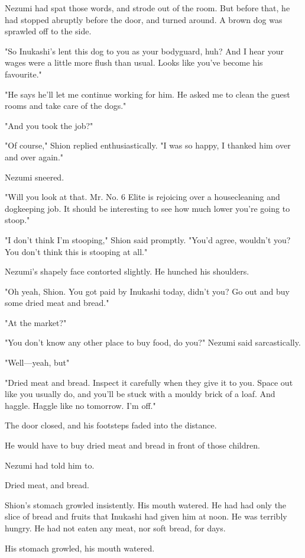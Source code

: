 Nezumi had spat those words, and strode out of the room. But before
that, he had stopped abruptly before the door, and turned around. A
brown dog was sprawled off to the side.

"So Inukashi's lent this dog to you as your bodyguard, huh? And I hear
your wages were a little more flush than usual. Looks like you've become
his favourite."

"He says he'll let me continue working for him. He asked me to clean the
guest rooms and take care of the dogs."

"And you took the job?"

"Of course," Shion replied enthusiastically. "I was so happy, I thanked
him over and over again."

Nezumi sneered.

"Will you look at that. Mr. No. 6 Elite is rejoicing over a
housecleaning and dogkeeping job. It should be interesting to see how
much lower you're going to stoop."

"I don't think I'm stooping," Shion said promptly. "You'd agree,
wouldn't you? You don't think this is stooping at all."

Nezumi's shapely face contorted slightly. He hunched his shoulders.

"Oh yeah, Shion. You got paid by Inukashi today, didn't you? Go out and
buy some dried meat and bread."

"At the market?"

"You don't know any other place to buy food, do you?" Nezumi said
sarcastically.

"Well---yeah, but\el "

"Dried meat and bread. Inspect it carefully when they give it to you.
Space out like you usually do, and you'll be stuck with a mouldy brick
of a loaf. And haggle. Haggle like no tomorrow. I'm off."

The door closed, and his footsteps faded into the distance.

He would have to buy dried meat and bread in front of those children.

Nezumi had told him to.

Dried meat, and bread.

Shion's stomach growled insistently. His mouth watered. He had had only
the slice of bread and fruits that Inukashi had given him at noon. He
was terribly hungry. He had not eaten any meat, nor soft bread, for
days.

His stomach growled, his mouth watered.


